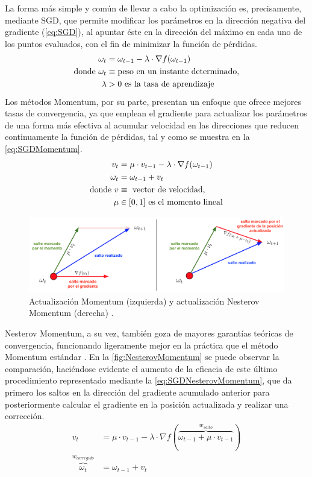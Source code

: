 La forma más simple y común de llevar a cabo la optimización es, precisamente, mediante SGD, que permite modificar los parámetros en la dirección negativa del gradiente (\autoref{eq:SGD}), al apuntar éste en la dirección del máximo en cada uno de los puntos evaluados, con el fin de minimizar la función de pérdidas.
\begin{align} \label{eq:SGD}
    \omega_t &= \omega_{t-1} - \lambda \cdot \nabla f(\omega_{t-1}) \\
    \text{donde}~  
    \omega_t &\equiv \text{peso en un instante determinado,} \notag \\
    \lambda &> 0 \text{\space es la tasa de aprendizaje} \notag
\end{align}
Los métodos Momentum, por su parte, presentan un enfoque que ofrece mejores tasas de convergencia, ya que emplean el gradiente para actualizar los parámetros de una forma más efectiva al acumular velocidad en las direcciones que reducen continuamente la función de pérdidas, tal y como se muestra en la \autoref{eq:SGDMomentum}. 
\begin{align}
    v_t &= \mu \cdot v_{t-1} - \lambda \cdot \nabla f(\omega_{t-1}) \\
    \omega_t &= \omega_{t-1} + v_t \label{eq:SGDMomentum} \\ 
    \text{donde}~
    v &\equiv \text{ vector de velocidad,} \notag \\
    \mu &\in [0,1] \text{\space es el momento lineal} \notag
\end{align}
\begin{figure}
    \centering
    \includegraphics[width=\textwidth]{Images/NesterovMomentum.png}
    \caption{Actualización Momentum (izquierda) y actualización Nesterov Momentum (derecha) \cite{CS231n}.}
    \label{fig:NesterovMomentum}
\end{figure}

Nesterov Momentum, a su vez, también goza de mayores garantías teóricas de convergencia, funcionando ligeramente mejor en la práctica que el método Momentum estándar \cite{Sutskever}. En la \autoref{fig:NesterovMomentum} se puede observar la comparación, haciéndose evidente el aumento de la eficacia de este último procedimiento representado mediante la \autoref{eq:SGDNesterovMomentum}, que da primero los saltos en la dirección del gradiente acumulado anterior para posteriormente calcular el gradiente en la posición actualizada y realizar una corrección.
\begin{align} 
    v_t &= \mu \cdot v_{t-1} - \lambda \cdot \nabla f(\overbrace{\omega_{t-1} + \mu \cdot v_{t-1}}^{w_{salto}}) \\
    \overbrace{\omega_t}^{w_{corregido}} &= \omega_{t-1} + v_t \label{eq:SGDNesterovMomentum}
\end{align}

